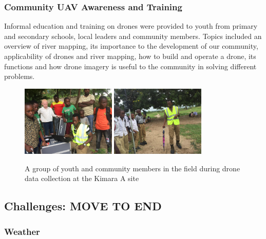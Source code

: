 \documentclass[a4paper,12pt,twoside]{article}
\begin{document}
     \subsubsection{Community UAV Awareness and Training}
        Informal education and training on drones were provided to youth from primary and secondary schools, local leaders and community members. Topics included an overview of river mapping, its importance to the development of our community, applicability of drones and river mapping, how to build and operate a drone, its functions and how drone imagery is useful to the community in solving different problems.
     
        \begin{figure} %
            \centering
            \includegraphics[width=0.4\textwidth]{images/image11.jpg}
            \includegraphics[width=0.4\textwidth]{images/image15.jpg}
            \caption{A group of youth and community members in the field during drone data collection at the Kimara A site}
        \end{figure}
        
\subsection{Challenges: MOVE TO END}
    \subsubsection{Weather}
    
\end{document}
